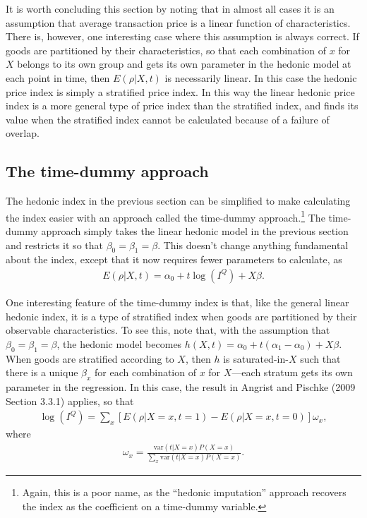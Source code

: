 \documentclass[]{article}
\begin{document}
It is worth concluding this section by noting that in almost all cases it is an assumption that average transaction price is a linear function of characteristics. There is, however, one interesting case where this assumption is always correct. If goods are partitioned by their characteristics, so that each combination of \(x\) for \(X\) belongs to its own group and gets its own parameter in the hedonic model at each point in time, then \(E(\rho | X, t)\) is necessarily linear. In this case the hedonic price index is simply a stratified price index. In this way the linear hedonic price index is a more general type of price index than the stratified index, and finds its value when the stratified index cannot be calculated because of a failure of overlap.

\hypertarget{the-time-dummy-approach}{%
\subsection{The time-dummy approach}\label{the-time-dummy-approach}}

The hedonic index in the previous section can be simplified to make calculating the index easier with an approach called the time-dummy approach.\footnote{Again, this is a poor name, as the ``hedonic imputation'' approach recovers the index as the coefficient on a time-dummy variable.} The time-dummy approach simply takes the linear hedonic model in the previous section and restricts it so that \(\beta_{0} = \beta_{1} = \beta\). This doesn't change anything fundamental about the index, except that it now requires fewer parameters to calculate, as
\begin{align*}
E(\rho | X, t) = \alpha_{0} + t \log(I^{Q}) + X \beta.
\end{align*}

One interesting feature of the time-dummy index is that, like the general linear hedonic index, it is a type of stratified index when goods are partitioned by their observable characteristics. To see this, note that, with the assumption that \(\beta_{0} = \beta_{1} = \beta\), the hedonic model becomes \(h(X, t) = \alpha_{0} + t (\alpha_{1} - \alpha_{0}) + X\beta\). When goods are stratified according to \(X\), then \(h\) is saturated-in-\(X\) such that there is a unique \(\beta_x\) for each combination of \(x\) for \(X\)---each stratum gets its own parameter in the regression. In this case, the result in Angrist and Pischke (2009 Section 3.3.1) applies, so that
\begin{align*}
\log(I^{Q}) = \sum_{x}[E(\rho | X = x, t = 1) - E(\rho | X = x, t = 0)] \omega_{x},
\end{align*}
where
\begin{align*}
\omega_{x} = \frac{\text{var}(t | X = x) P(X = x)}{\sum_{x} \text{var}(t | X = x) P(X = x)}.
\end{align*}
\end{document}
